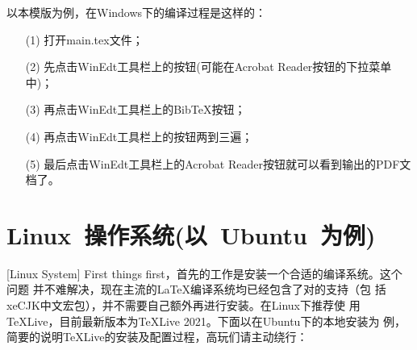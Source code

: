 以本模版为例，在Windows下的编译过程是这样的：
\begin{enumerate}
\item[(1)] 打开main.tex文件；
\item[(2)] 先点击WinEdt工具栏上的\XeLaTeX{}按钮(可能在Acrobat Reader按钮的下拉菜单中)；
\item[(3)] 再点击WinEdt工具栏上的Bib\TeX{}按钮；
\item[(4)] 再点击WinEdt工具栏上的\XeLaTeX{}按钮两到三遍；
\item[(5)] 最后点击WinEdt工具栏上的Acrobat Reader按钮就可以看到输出的PDF文档了。
\end{enumerate}

\section{Linux~操作系统(以~Ubuntu~为例)}[Linux System]
First things first，首先的工作是安装一个合适的\XeTeX{}编译系统。这个问题
并不难解决，现在主流的\LaTeX{}编译系统均已经包含了对\XeTeX{}的支持（包
括xeCJK中文宏包），并不需要自己额外再进行安装。在Linux下推荐使
用\TeX{}Live，目前最新版本为\TeX{}Live 2021。下面以在Ubuntu下的本地安装为
例，简要的说明\TeX{}Live的安装及配置过程，高玩们请主动绕行：

